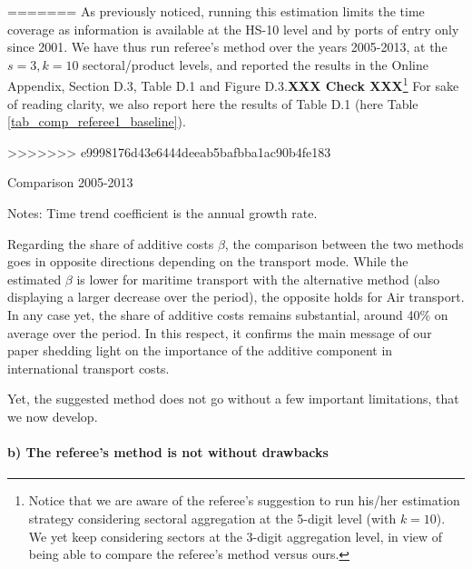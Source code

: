 \documentclass[a4paper,11pt]{article}
\begin{document}
\begin{itemize}
\begin{enumerate}
    \begin{table}[htbp]
=======
As previously noticed, running this estimation limits the time coverage as information is available at the HS-10 level and by ports of entry only since 2001. We have thus run referee's method over the years 2005-2013, at the $s=3, k=10$ sectoral/product levels, and reported the results in the Online Appendix, Section D.3, Table D.1 and Figure D.3.\textbf{XXX Check XXX}\footnote{Notice that we are aware of the referee's suggestion to run his/her estimation strategy considering sectoral aggregation at the 5-digit level (with $k=10$). We yet keep considering sectors at the 3-digit aggregation level, in view of being able to compare the referee's method versus ours.} For sake of reading clarity, we also report here the results of Table D.1 (here Table \ref{tab_comp_referee1_baseline}).

\begin{table}[htbp]
>>>>>>> e9998176d43e6444deeab5bafbba1ac90b4fe183
	\caption{Comparison 2005-2013}
	\begin{center}		
		
	
{\parbox[l]{12cm}{ \vspace{4pt}\footnotesize{Notes: Time trend coefficient is the annual growth rate.}}}
\end{center}
	\label{tab_comp_referee1_baseline}%
\end{table}%


Regarding the share of additive costs $\beta$, the comparison between the two methods goes in opposite directions depending on the transport mode. While the estimated $\beta$ is lower for maritime transport with the alternative method (also displaying a larger decrease over the period), the opposite holds for Air transport. In any case yet, the share of additive costs remains substantial, around 40\% on average over the period. In this respect, it confirms the main message of our paper shedding light on the importance of the additive component in international transport costs.

Yet, the suggested method does not go without a few important limitations, that we now develop.


\paragraph{b) The referee's method is not without drawbacks}



\end{table}
\end{enumerate}
\end{itemize}
\end{document}
